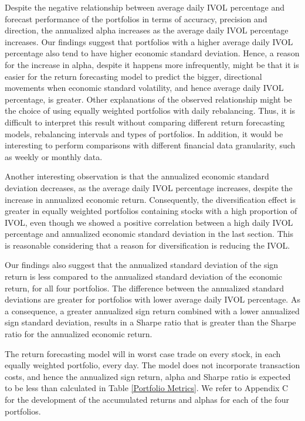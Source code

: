 Despite the negative relationship between average daily IVOL percentage and forecast performance of the portfolios in terms of accuracy, precision and direction, the annualized alpha increases as the average daily IVOL percentage increases. Our findings suggest that portfolios with a higher average daily IVOL percentage also tend to have higher economic standard deviation. Hence, a reason for the increase in alpha, despite it happens more infrequently, might be that it is easier for the return forecasting model to predict the bigger, directional movements when economic standard volatility, and hence average daily IVOL percentage, is greater. Other explanations of the observed relationship might be the choice of using equally weighted portfolios with daily rebalancing. Thus, it is difficult to interpret this result without comparing different return forecasting models, rebalancing intervals and types of portfolios. In addition, it would be interesting to perform comparisons with different financial data granularity, such as weekly or monthly data.

Another interesting observation is that the annualized economic standard deviation decreases, as the average daily IVOL percentage increases, despite the increase in annualized economic return. Consequently, the diversification effect is greater in equally weighted portfolios containing stocks with a high proportion of IVOL, even though we showed a positive correlation between a high daily IVOL percentage and annualized economic standard deviation in the last section. This is reasonable considering that a reason for diversification is reducing the IVOL.

Our findings also suggest that the annualized standard deviation of the sign return is less compared to the annualized standard deviation of the economic return, for all four portfolios. The difference between the annualized standard deviations are greater for portfolios with lower average daily IVOL percentage. As a consequence, a greater annualized sign return combined with a lower annualized sign standard deviation, results in a Sharpe ratio that is greater than the Sharpe ratio for the annualized economic return. 

The return forecasting model will in worst case trade on every stock, in each equally weighted portfolio, every day. The model does not incorporate transaction costs, and hence the annualized sign return, alpha and Sharpe ratio is expected to be less than calculated in Table \ref{Portfolio Metrics}. We refer to Appendix C for the development of the accumulated returns and alphas for each of the four portfolios. 

